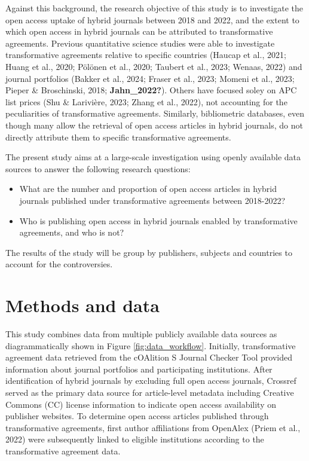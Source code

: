 \documentclass[a4paper,man,floatsintext,longtable,noextraspace,12pt]{apa6}
\providecommand{\tightlist}{%
  \setlength{\itemsep}{0pt}\setlength{\parskip}{0pt}}
\begin{document}
Against this background, the research objective of this study is to
investigate the open access uptake of hybrid journals between 2018 and
2022, and the extent to which open access in hybrid journals can be
attributed to transformative agreements. Previous quantitative science
studies were able to investigate transformative agreements relative to
specific countries (Haucap et al., 2021; Huang et al., 2020; Pölönen et
al., 2020; Taubert et al., 2023; Wenaas, 2022) and journal portfolios
(Bakker et al., 2024; Fraser et al., 2023; Momeni et al., 2023; Pieper
\& Broschinski, 2018; \textbf{Jahn\_2022?}). Others have focused soley
on APC list prices (Shu \& Larivière, 2023; Zhang et al., 2022), not
accounting for the peculiarities of transformative agreements.
Similarly, bibliometric databases, even though many allow the retrieval
of open access articles in hybrid journals, do not directly attribute
them to specific transformative agreements.

The present study aims at a large-scale investigation using openly
available data sources to answer the following research questions:

\begin{itemize}
\tightlist
\item
  What are the number and proportion of open access articles in hybrid
  journals published under transformative agreements between 2018-2022?
\item
  Who is publishing open access in hybrid journals enabled by
  transformative agreements, and who is not?
\end{itemize}

The results of the study will be group by publishers, subjects and
countries to account for the controversies.

\hypertarget{methods-and-data}{%
\section{Methods and data}\label{methods-and-data}}

This study combines data from multiple publicly available data sources
as diagrammatically shown in Figure \ref{fig:data_workflow}. Initially,
transformative agreement data retrieved from the cOAlition S Journal
Checker Tool provided information about journal portfolios and
participating institutions. After identification of hybrid journals by
excluding full open access journals, Crossref served as the primary data
source for article-level metadata including Creative Commons (CC)
license information to indicate open access availability on publisher
websites. To determine open access articles published through
transformative agreements, first author affiliations from OpenAlex
(Priem et al., 2022) were subsequently linked to eligible institutions
according to the transformative agreement data.
\end{document}
